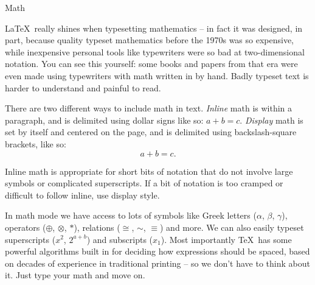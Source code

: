 \documentclass{article}
\begin{document}
\begin{center}
\Large Math
\end{center}

\LaTeX\ really shines when typesetting mathematics -- in fact it was designed, in part, because quality typeset mathematics before the 1970s was so expensive, while inexpensive personal tools like typewriters were so bad at two-dimensional notation. You can see this yourself: some books and papers from that era were even made using typewriters with math written in by hand. Badly typeset text is harder to understand and painful to read.

There are two different ways to include math in text. \emph{Inline} math is within a paragraph, and is delimited using dollar signs like so: $a + b = c$. \emph{Display} math is set by itself and centered on the page, and is delimited using backslash-square brackets, like so: \[ a + b = c. \]

Inline math is appropriate for short bits of notation that do not involve large symbols or complicated superscripts. If a bit of notation is too cramped or difficult to follow inline, use display style.

In math mode we have access to lots of symbols like Greek letters ($\alpha$, $\beta$, $\gamma$), operators ($\oplus$, $\otimes$, $\ast$), relations ($\cong$, $\sim$, $\equiv$) and more. We can also easily typeset superscripts ($x^2$, $2^{a+b}$) and subscripts ($x_1$). Most importantly \TeX\ has some powerful algorithms built in for deciding how expressions should be spaced, based on decades of experience in traditional printing -- so we don't have to think about it. Just type your math and move on.
\end{document}
